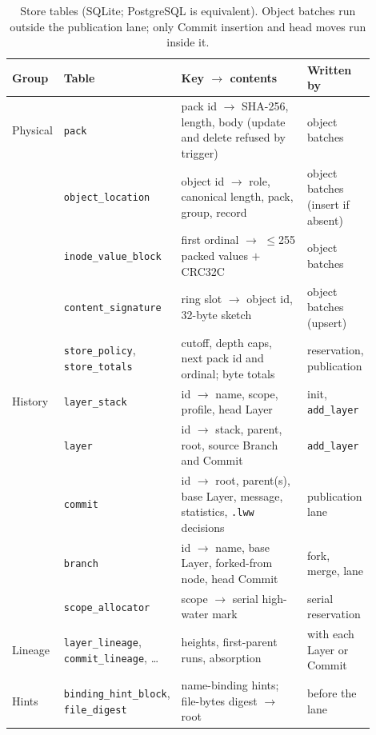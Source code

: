 \begin{table}[h]
\centering
\small
\begin{tabular}{p{0.08\linewidth} p{0.24\linewidth} p{0.40\linewidth} p{0.18\linewidth}}
\toprule
Group & Table & Key $\rightarrow$ contents & Written by \\
\midrule
Physical & \texttt{pack} & pack id $\rightarrow$ SHA-256, length, body (update and delete refused by trigger) & object batches \\
 & \texttt{object\_location} & object id $\rightarrow$ role, canonical length, pack, group, record & object batches (insert if absent) \\
 & \texttt{inode\_value\_block} & first ordinal $\rightarrow$ $\leq$255 packed values $+$ CRC32C & object batches \\
 & \texttt{content\_signature} & ring slot $\rightarrow$ object id, 32-byte sketch & object batches (upsert) \\
 & \texttt{store\_policy}, \texttt{store\_totals} & cutoff, depth caps, next pack id and ordinal; byte totals & reservation, publication \\
History & \texttt{layer\_stack} & id $\rightarrow$ name, scope, profile, head Layer & init, \texttt{add\_layer} \\
 & \texttt{layer} & id $\rightarrow$ stack, parent, root, source Branch and Commit & \texttt{add\_layer} \\
 & \texttt{commit} & id $\rightarrow$ root, parent(s), base Layer, message, statistics, \texttt{.lww} decisions & publication lane \\
 & \texttt{branch} & id $\rightarrow$ name, base Layer, forked-from node, head Commit & fork, merge, lane \\
 & \texttt{scope\_allocator} & scope $\rightarrow$ serial high-water mark & serial reservation \\
Lineage & \texttt{layer\_lineage}, \texttt{commit\_lineage}, \ldots & heights, first-parent runs, absorption & with each Layer or Commit \\
Hints & \texttt{binding\_hint\_block}, \texttt{file\_digest} & name-binding hints; file-bytes digest $\rightarrow$ root & before the lane \\
\bottomrule
\end{tabular}
\caption{Store tables (SQLite; PostgreSQL is equivalent). Object batches run outside the
publication lane; only Commit insertion and head moves run inside it.}
\label{tab:schema}
\end{table}

